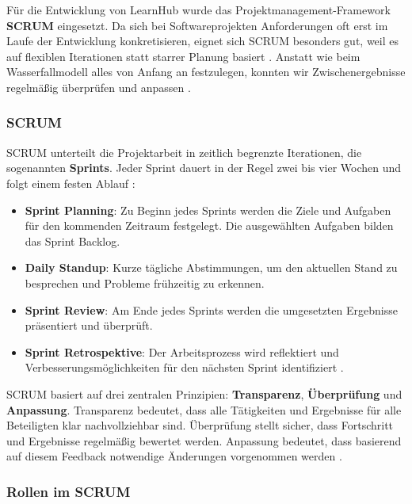 Für die Entwicklung von LearnHub wurde das Projektmanagement-Framework 
\textbf{SCRUM} eingesetzt. Da sich bei Softwareprojekten Anforderungen 
oft erst im Laufe der Entwicklung konkretisieren, eignet sich SCRUM 
besonders gut, weil es auf flexiblen Iterationen statt starrer Planung 
basiert \cite{dong2024}. Anstatt wie beim Wasserfallmodell alles von 
Anfang an festzulegen, konnten wir Zwischenergebnisse regelmäßig 
überprüfen und anpassen \cite{kaack2016}.

\subsubsection{SCRUM}

SCRUM unterteilt die Projektarbeit in zeitlich begrenzte Iterationen, 
die sogenannten \textbf{Sprints}. Jeder Sprint dauert in der Regel 
zwei bis vier Wochen und folgt einem festen Ablauf \cite{schwaber2020}:

\begin{itemize}
    \item \textbf{Sprint Planning}: Zu Beginn jedes Sprints werden 
    die Ziele und Aufgaben für den kommenden Zeitraum festgelegt. 
    Die ausgewählten Aufgaben bilden das Sprint Backlog.

    \item \textbf{Daily Standup}: Kurze tägliche Abstimmungen, um 
    den aktuellen Stand zu besprechen und Probleme frühzeitig zu 
    erkennen.

    \item \textbf{Sprint Review}: Am Ende jedes Sprints werden die 
    umgesetzten Ergebnisse präsentiert und überprüft.

    \item \textbf{Sprint Retrospektive}: Der Arbeitsprozess wird 
    reflektiert und Verbesserungsmöglichkeiten für den nächsten 
    Sprint identifiziert \cite{scrumguide2020}.
\end{itemize}

SCRUM basiert auf drei zentralen Prinzipien: \textbf{Transparenz}, 
\textbf{Überprüfung} und \textbf{Anpassung}. Transparenz bedeutet, 
dass alle Tätigkeiten und Ergebnisse für alle Beteiligten klar 
nachvollziehbar sind. Überprüfung stellt sicher, dass Fortschritt 
und Ergebnisse regelmäßig bewertet werden. Anpassung bedeutet, 
dass basierend auf diesem Feedback notwendige Änderungen vorgenommen 
werden \cite{schwaber2020}.

\subsubsection{Rollen im SCRUM}

